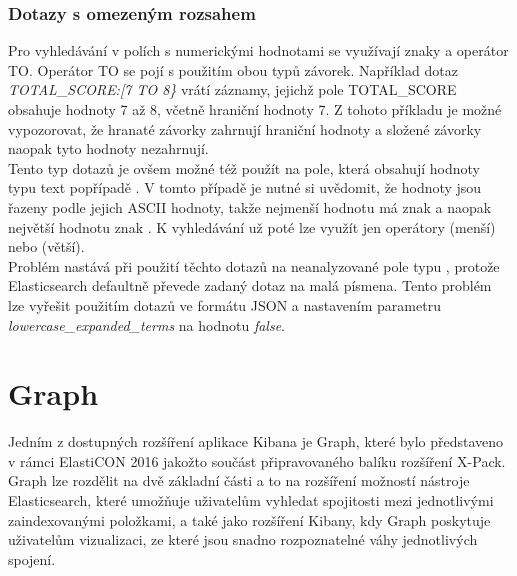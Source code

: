 \documentclass[czech,BP]{thesiskiv}
\begin{document}
\subsubsection{Dotazy s omezeným rozsahem}	
Pro vyhledávání v polích s numerickými hodnotami se využívají znaky \uv{\{\}, [], <, >, =}  a operátor TO. Operátor TO se pojí s použitím obou typů závorek. Například dotaz \textit{TOTAL\_SCORE:[7 TO 8\}} vrátí záznamy, jejichž pole TOTAL\_SCORE obsahuje hodnoty 7 až 8, včetně hraniční hodnoty 7. Z tohoto příkladu je možné vypozorovat, že hranaté závorky zahrnují hraniční hodnoty a složené závorky naopak tyto hodnoty nezahrnují.
\\
Tento typ dotazů je ovšem možné též použít na pole, která obsahují hodnoty typu text popřípadě . V tomto případě je nutné si uvědomit, že hodnoty jsou řazeny podle jejich ASCII hodnoty, takže nejmenší hodnotu má znak  a naopak největší hodnotu znak . K vyhledávání už poté lze využít jen operátory \uv{<} (menší) nebo \uv{>} (větší).
\\
Problém nastává při použití těchto dotazů na neanalyzované pole typu , protože Elasticsearch defaultně převede zadaný dotaz na malá písmena. Tento problém lze vyřešit použitím dotazů ve formátu JSON a nastavením parametru \textit{lowercase\_expanded\_terms} na hodnotu \textit{false}.

	


\section{Graph}
Jedním z dostupných rozšíření aplikace Kibana je Graph, které bylo představeno v rámci ElastiCON 2016 jakožto součást připravovaného balíku rozšíření X-Pack. Graph lze rozdělit na dvě základní části a to na rozšíření možností nástroje Elasticsearch, které umožňuje uživatelům vyhledat spojitosti mezi jednotlivými zaindexovanými položkami, a také jako rozšíření Kibany, kdy Graph poskytuje uživatelům vizualizaci, ze které jsou snadno rozpoznatelné váhy jednotlivých spojení.
\end{document}
